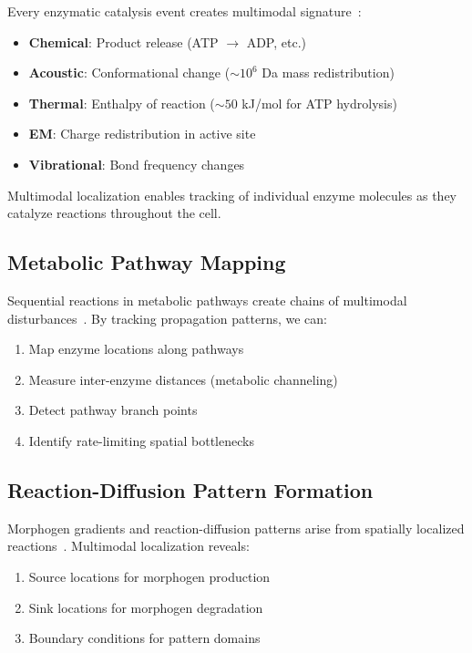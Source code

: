 \documentclass[11pt,a4paper]{article}
\theoremstyle{remark}
\begin{document}
Every enzymatic catalysis event creates multimodal signature~\citep{xie1998single,english2011single}:
\begin{itemize}
    \item \textbf{Chemical}: Product release (ATP $\to$ ADP, etc.)
    \item \textbf{Acoustic}: Conformational change ($\sim 10^6$ Da mass redistribution)
    \item \textbf{Thermal}: Enthalpy of reaction ($\sim 50$ kJ/mol for ATP hydrolysis)
    \item \textbf{EM}: Charge redistribution in active site
    \item \textbf{Vibrational}: Bond frequency changes
\end{itemize}

Multimodal localization enables tracking of individual enzyme molecules as they catalyze reactions throughout the cell.

\subsection{Metabolic Pathway Mapping}

Sequential reactions in metabolic pathways create chains of multimodal disturbances~\citep{srere1987complexes,sweetlove2008role}. By tracking propagation patterns, we can:
\begin{enumerate}
    \item Map enzyme locations along pathways
    \item Measure inter-enzyme distances (metabolic channeling)
    \item Detect pathway branch points
    \item Identify rate-limiting spatial bottlenecks
\end{enumerate}

\subsection{Reaction-Diffusion Pattern Formation}

Morphogen gradients and reaction-diffusion patterns arise from spatially localized reactions~\citep{turing1952chemical,murray2002mathematical}. Multimodal localization reveals:
\begin{enumerate}
    \item Source locations for morphogen production
    \item Sink locations for morphogen degradation
    \item Boundary conditions for pattern domains
\end{enumerate}
\end{document}
